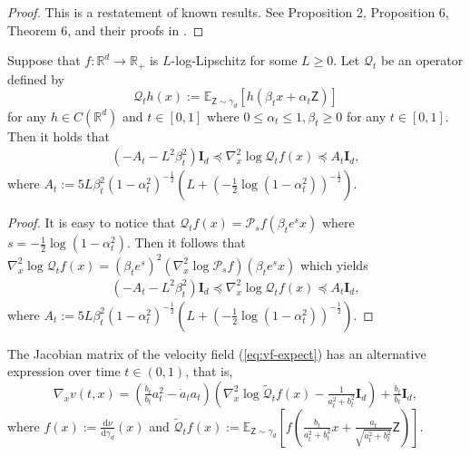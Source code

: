 \documentclass[twoside,11pt]{article}
\def\rmI{{\mathbf{I}}}
\def\sR{{\mathbb{R}}}
\newcommand{\E}{\mathbb{E}}
\def\paref#1{(\ref{#1})}
\newcommand{\diff}{\mathrm{d}}
\numberwithin{equation}{section}
\begin{document}
\begin{proof}
    This is a restatement of known results. See Proposition 2, Proposition 6, Theorem 6, and their proofs in \citet{fathi2023transportation}.
\end{proof}

\begin{corollary} \label{cor:bd-op}
Suppose that $f: \sR^d \to \sR_+$ is $L$-log-Lipschitz for some $L \ge 0$.
Let $\mathcal{Q}_t$ be an operator defined by
\begin{equation}
    \label{eq:op-ab}
    \mathcal{Q}_t h(x) := \E_{\mathsf{Z} \sim \gamma_d} [h(\beta_t x + \alpha_t \mathsf{Z})]
\end{equation}
for any $h \in C(\sR^d)$ and $t \in [0, 1]$ where $0 \le \alpha_t \le 1, \beta_t \ge 0$ for any $t \in [0, 1]$.
Then it holds that
\begin{align*}
    \left(-A_t - L^2 \beta_t^2 \right) \rmI_d
    \preceq \nabla^2_x \log \mathcal{Q}_t f(x)
    \preceq A_t \rmI_d,
\end{align*}
where $A_t := 5L \beta_t^2 (1 - \alpha_t^2)^{-\frac12} (L + (-\frac12 \log (1 - \alpha_t^2))^{-\frac12})$.
\end{corollary}

\begin{proof}
It is easy to notice that $\mathcal{Q}_t f(x) = \mathcal{P}_s f (\beta_t e^s x)$ where $s = -\frac12 \log (1 - \alpha_t^2)$.
Then it follows that $\nabla^2_x \log \mathcal{Q}_t f(x) = (\beta_t e^s)^2 (\nabla^2_x \log \mathcal{P}_s f) (\beta_t e^s x)$ which yields
\begin{align*}
    \left(-A_t - L^2 \beta_t^2 \right) \rmI_d
    \preceq \nabla^2_x \log \mathcal{Q}_t f(x)
    \preceq A_t \rmI_d,
\end{align*}
where $A_t := 5L \beta_t^2 (1 - \alpha_t^2)^{-\frac12} (L + (-\frac12 \log (1 - \alpha_t^2))^{-\frac12})$.
\end{proof}


\begin{lemma} \label{lm:vf-op}
The Jacobian matrix of the velocity field \paref{eq:vf-expect} has an alternative expression over time $t \in (0, 1)$, that is,
\begin{equation*}
    \nabla_x v(t, x) = \left( \tfrac{\dot{b}_t}{b_t} a_t^2 - \dot{a}_t a_t \right) \left( \nabla^2_x \log \widetilde{\mathcal{Q}}_t f(x) - \tfrac{1}{a_t^2 + b_t^2} \rmI_d \right) + \tfrac{\dot{b}_t}{b_t} \rmI_d,
\end{equation*}
where $f(x) := \frac{\diff \nu}{\diff \gamma_d}(x)$ and $\widetilde{\mathcal{Q}}_t f(x) := \E_{\mathsf{Z} \sim \gamma_d} [ f ( \frac{b_t}{a_t^2 + b_t^2} x + \frac{a_t}{\sqrt{a_t^2 + b_t^2}} \mathsf{Z}) ]$.
\end{lemma}
\end{document}
